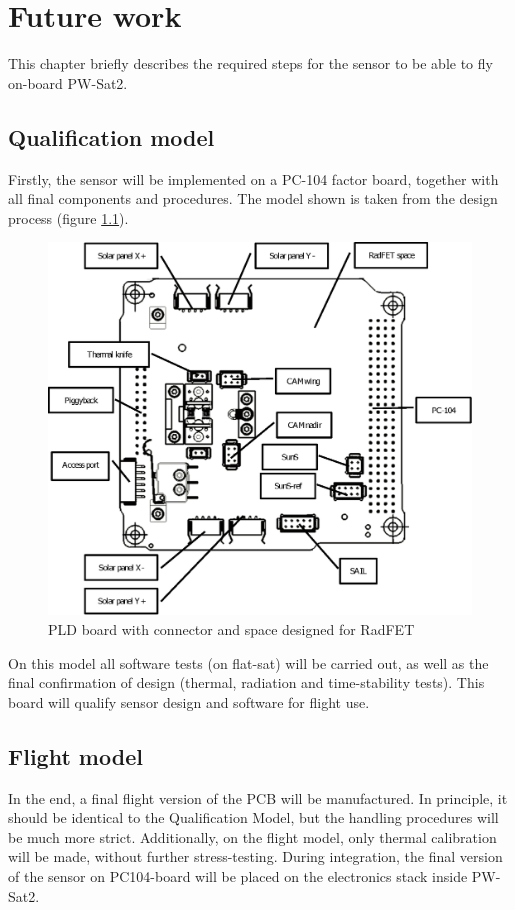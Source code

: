 \chapter{Future work}

This chapter briefly describes the required steps for the sensor to be able to fly on-board PW-Sat2.

\section{Qualification model}
    Firstly, the sensor will be implemented on a PC-104 factor board, together with all final components and procedures. The model shown is taken from the design process (figure \ref{PLD_BOARD}).

    \begin{figure}[H]
        \centering
        \includegraphics[width=0.7\paperwidth]{img/08/PC104pldBoard.eps}
        \caption{PLD board with connector and space designed for RadFET}
        \label{PLD_BOARD}
    \end{figure}


    On this model all software tests (on flat-sat) will be carried out, as well as the final confirmation of design (thermal, radiation and time-stability tests). This board will qualify sensor design and software for flight use.

\section{Flight model}
    In the end, a final flight version of the PCB will be manufactured. In principle, it should be identical to the Qualification Model, but the handling procedures will be much more strict. Additionally, on the flight model, only thermal calibration will be made, without further stress-testing. During integration, the final version of the sensor on PC104-board will be placed on the electronics stack inside PW-Sat2.

